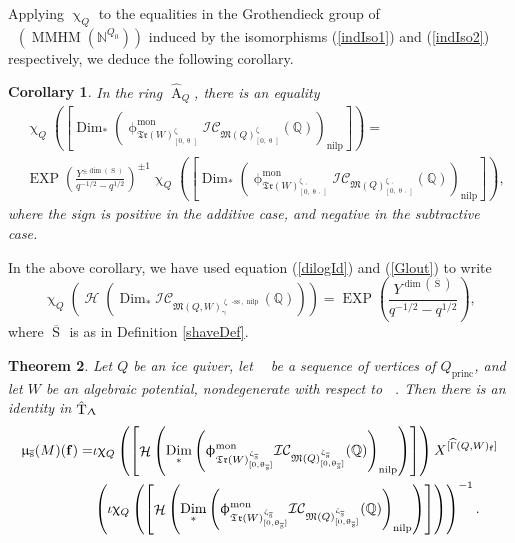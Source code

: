\documentclass[a4paper,10pt]{amsart}
\newtheorem{theorem}{Theorem}[section]
\newtheorem{corollary}[theorem]{Corollary}
\newcommand{\ff}{\mathbf{f}}
\DeclareMathOperator{\Simp}{S}
\newcommand{\WWW}{\mathfrak{Tr}(W)}
\newcommand{\Mst}{\mathfrak{M}}
\newcommand{\ICS}{\mathcal{IC}}
\newcommand{\phim}[1]{\phi^{\mon}_{#1}}
\newcommand{\shave}{\overline{\Simp}_{\Ss}}
\renewcommand{\theta}{\uptheta}
\renewcommand{\gamma}{\upgamma}
\renewcommand{\zeta}{\upzeta}
\renewcommand{\chi}{\upchi}
\renewcommand{\Lambda}{\Uplambda}
\renewcommand{\Gamma}{\Upgamma}
\renewcommand{\phi}{\upphi}
\renewcommand{\mu}{\upmu}
\DeclareMathOperator{\sst}{-ss}
\DeclareMathOperator{\nilp}{nilp}
\DeclareMathOperator{\Dim}{Dim}
\DeclareMathOperator{\Tor}{T}
\DeclareMathOperator{\Ror}{A}
\DeclareMathOperator{\mon}{mon}
\DeclareMathOperator{\MMHM}{MMHM}
\DeclareMathOperator{\HGamma}{\widehat{\Gamma}}
\DeclareMathOperator{\EXP}{EXP}
\DeclareMathOperator{\princ}{princ}
\DeclareMathOperator{\Ss}{\overline{s}}
\newcommand{\pleth}[1]{\EXP\left(#1\right)}
\DeclareMathOperator{\Ho}{\mathcal{H}}
\DeclareMathOperator{\Dulf}{\mathcal{D}^{\geq, lf}}
\begin{document}
Applying $\chi_Q$ to the equalities in the Grothendieck group of $\Dulf(\MMHM(\mathbb{N}^{Q_0}))$ induced by the isomorphisms (\ref{indIso1}) and (\ref{indIso2}) respectively, we deduce the following corollary.
\begin{corollary}
\label{indCor}
In the ring $\hat{\Ror}_Q$, there is an equality
\begin{align*}
&\chi_Q\left(\left[\Dim_* \left(\phim{\WWW^{\zeta_{\Ss}}_{[0,\theta_{\Ss}]}}\ICS_{\Mst(Q)_{[0,\theta_{\Ss}]}^{\zeta_{\Ss}}}(\mathbb{Q})\right)_{\nilp}\right]\right)=\\
&\EXP\left(\frac{Y^{\pm\dim(\Simp_{\Ss})}}{q^{-1/2}-q^{1/2}}\right)^{\pm 1}\chi_Q\left(\left[\Dim_* \left(\phim{\WWW_{[0,\theta_{\Ss'}]}^{\zeta_{\Ss'}} }\ICS_{\Mst(Q)_{[0,\theta_{\Ss'}]}^{\zeta_{\Ss'}} }(\mathbb{Q})\right)_{\nilp}\right]\right),
\end{align*}
where the sign is positive in the additive case, and negative in the subtractive case.
\end{corollary}
In the above corollary, we have used equation (\ref{dilogId}) and (\ref{Glout}) to write
\[
\chi_Q\left(\Ho\left(\Dim_*\ICS_{\Mst(Q,W)_{\gamma}^{\zeta_{\Ss}\sst,\nilp}}(\mathbb{Q})\right)\right)=\pleth{\frac{Y^{\dim(\shave)}}{q^{-1/2}-q^{1/2}}},
\]
where $\shave$ is as in Definition \ref{shaveDef}.
\begin{theorem}\cite[Thm.5.11]{Efi11}\label{sfrThm}
Let $Q$ be an ice quiver, let $\Ss$ be a sequence of vertices of $Q_{\princ}$, and let $W$ be an algebraic potential, nondegenerate with respect to $\Ss$.  Then there is an identity in $\hat{\Tor}_{\Lambda}$
\begin{align}
\label{mutId}
\mu_{\Ss}(M)(\ff)= &\iota\chi_Q\left(\left[\Ho\left(\Dim_* \left(\phim{\WWW_{[0,\theta_{\Ss}]}^{\zeta_{\Ss}} }\ICS_{\Mst(Q)_{[0,\theta_{\Ss}]}^{\zeta_{\Ss}} }(\mathbb{Q})\right)_{\nilp}\right)\right]\right)X^{[\HGamma(Q,W)_{\ff}]}\\&\left(\iota\chi_Q\left(\left[\Ho\left(\Dim_* \left(\phim{\WWW_{[0,\theta_{\Ss}]}^{\zeta_{\Ss}} }\ICS_{\Mst(Q)_{[0,\theta_{\Ss}]}^{\zeta_{\Ss}} }(\mathbb{Q})\right)_{\nilp}\right)\right]\right)\right)^{-1}.\nonumber
\end{align}
\end{theorem}
\end{document}
